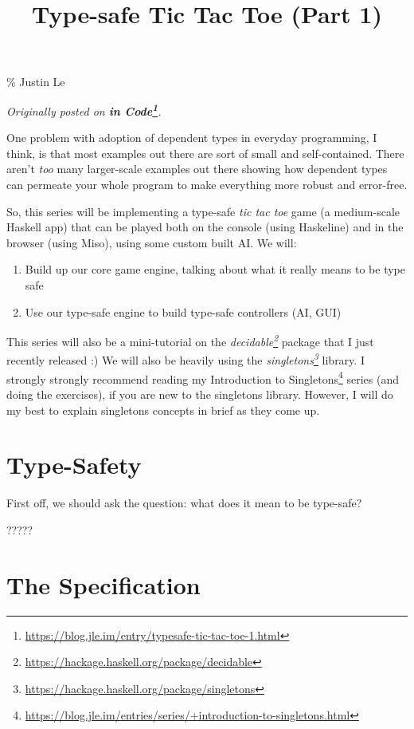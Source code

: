 \documentclass[]{article}
\title{Type-safe Tic Tac Toe (Part 1)}
\renewcommand{\href}[2]{#2\footnote{\url{#1}}}
\begin{document}
\maketitle

\% Justin Le

\emph{Originally posted on
\textbf{\href{https://blog.jle.im/entry/typesafe-tic-tac-toe-1.html}{in Code}}.}

One problem with adoption of dependent types in everyday programming, I think,
is that most examples out there are sort of small and self-contained. There
aren't \emph{too} many larger-scale examples out there showing how dependent
types can permeate your whole program to make everything more robust and
error-free.

So, this series will be implementing a type-safe \emph{tic tac toe} game (a
medium-scale Haskell app) that can be played both on the console (using
Haskeline) and in the browser (using Miso), using some custom built AI. We will:

\begin{enumerate}
\def\labelenumi{\arabic{enumi}.}
\tightlist
\item
  Build up our core game engine, talking about what it really means to be type
  safe
\item
  Use our type-safe engine to build type-safe controllers (AI, GUI)
\end{enumerate}

This series will also be a mini-tutorial on the
\emph{\href{https://hackage.haskell.org/package/decidable}{decidable}} package
that I just recently released :) We will also be heavily using the
\emph{\href{https://hackage.haskell.org/package/singletons}{singletons}}
library. I strongly strongly recommend reading my
\href{https://blog.jle.im/entries/series/+introduction-to-singletons.html}{Introduction
to Singletons} series (and doing the exercises), if you are new to the
singletons library. However, I will do my best to explain singletons concepts in
brief as they come up.

\section{Type-Safety}\label{type-safety}

First off, we should ask the question: what does it mean to be type-safe?

?????

\section{The Specification}\label{the-specification}
\end{document}
